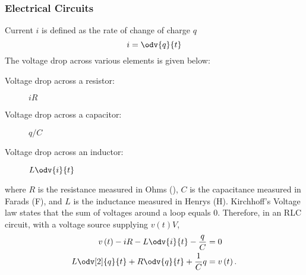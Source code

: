 \documentclass{article}
\begin{document}
\subsubsection{Electrical Circuits}
Current \(i\) is defined as the rate of change of charge \(q\)
\begin{equation*}
    i = \odv{q}{t}
\end{equation*}
The voltage drop across various elements is given below:
\begin{description}
    \item[Voltage drop across a resistor:] \(iR\)
    \item[Voltage drop across a capacitor:] \(q/C\)
    \item[Voltage drop across an inductor:] \(L \odv{i}{t}\)
\end{description}
where \(R\) is the resistance measured in Ohms (\unit{\Omega}),
\(C\) is the capacitance measured in Farads (\unit{F}),
and \(L\) is the inductance measured in Henrys (\unit{H}).
Kirchhoff's Voltage law states that the sum of voltages around a loop
equals 0. Therefore, in an RLC circuit, with a voltage source supplying
\(v\left( t \right)\unit{V}\),
\begin{align*}
    v\left( t \right) - iR - L \odv{i}{t} - \frac{q}{C} & = 0                  \\
    L \odv[2]{q}{t} + R\odv{q}{t} + \frac{1}{C}q        & = v\left( t \right).
\end{align*}
\end{document}
